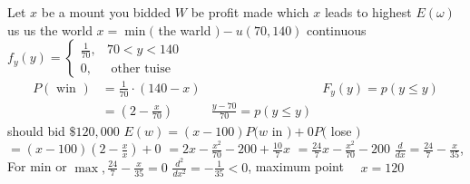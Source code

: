 Let $x$ be a mount you bidded
$W$ be profit made
which $x$ leads to highest $E(\omega)$
us us the world
$x=\min ($ the warld $)-u(70,140)$ continuous $f_{y}(y)=\left\{\begin{array}{ll}\frac{1}{70}, & 70<y<140 \\ 0, & \text { other tuise }\end{array}\right.$
\[
\begin{aligned}
P(\text { win }) &=\frac{1}{70} \cdot(140-x) & & F_{y}(y)=p(y \leq y) \\
&=\left(2-\frac{x}{70}\right) & \frac{y-70}{70}=p(y \leq y)
\end{aligned}
\]
should bid $\$ 120,000$
$E(w)=(x-100) P(w$ in $)+0 P($ lose $)$
$=(x-100)\left(2-\frac{x}{x}\right)+0$
$=2 x-\frac{x^{2}}{70}-200+\frac{10}{7} x$
$=\frac{24}{7} x-\frac{x^{2}}{70}-200$
$\frac{d}{d x}=\frac{24}{7}-\frac{x}{35}$, For min or $\max , \frac{24}{7}-\frac{x}{35}=0$
$\frac{d^{2}}{d x^{2}}=-\frac{1}{35}<0$, maximum point $\quad x=120$